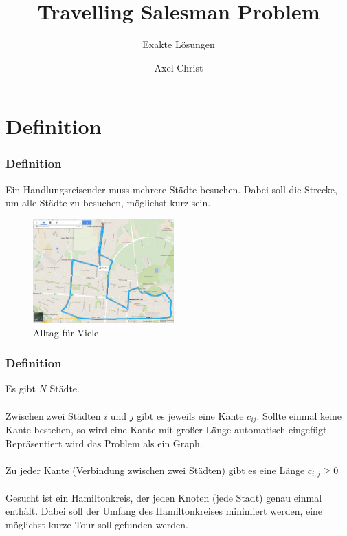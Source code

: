 \documentclass[handout]{beamer}
\title[TSP]
{Travelling Salesman Problem}
\subtitle{Exakte Lösungen}
\author
{Axel Christ}
\institute{DHBW Karlsruhe}
\begin{document}
  \frame{\titlepage}
  \section{Definition}
  \begin{frame}
    \frametitle{Definition}
    Ein Handlungsreisender muss mehrere Städte besuchen. Dabei soll die
    Strecke, um alle Städte zu besuchen, möglichst kurz sein.
    \pause
    \begin{figure}
      \centering
      \includegraphics[width=\linewidth,height=150px,keepaspectratio]{alltag.png}
      \caption{Alltag für Viele}
    \end{figure}
  \end{frame}

  \begin{frame}
    \frametitle{Definition}
    Es gibt $N$ Städte.
    \pause
    \\~\\

    Zwischen zwei Städten $i$ und $j$ gibt es jeweils eine Kante $c_{ij}$.
    Sollte einmal keine Kante bestehen, so wird eine Kante mit großer Länge
    automatisch eingefügt. Repräsentiert wird das Problem als ein Graph.
    \pause
    \\~\\

    Zu jeder Kante (Verbindung zwischen zwei Städten) gibt es eine Länge $c_{i,j} \geq 0$
    \pause
    \\~\\

    Gesucht ist ein Hamiltonkreis, der jeden Knoten (jede Stadt) genau einmal enthält.
    Dabei soll der Umfang des Hamiltonkreises minimiert werden, eine möglichst kurze Tour
    soll gefunden werden.
  \end{frame}
\end{document}
